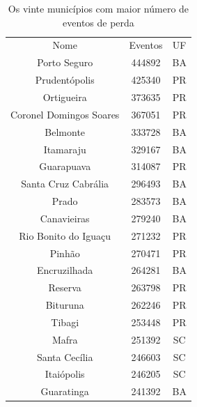 \begin{table}[h!]
    \centering
    \begin{tabular}{|c | c | c|}
    \hline
                    Nome & Eventos & UF \\
            Porto Seguro & 444892 & BA \\
           Prudentópolis & 425340 & PR \\
              Ortigueira & 373635 & PR \\
 Coronel Domingos Soares & 367051 & PR \\
                Belmonte & 333728 & BA \\
               Itamaraju & 329167 & BA \\
              Guarapuava & 314087 & PR \\
     Santa Cruz Cabrália & 296493 & BA \\
                   Prado & 283573 & BA \\
             Canavieiras & 279240 & BA \\
    Rio Bonito do Iguaçu & 271232 & PR \\
                  Pinhão & 270471 & PR \\
            Encruzilhada & 264281 & BA \\
                 Reserva & 263798 & PR \\
                Bituruna & 262246 & PR \\
                  Tibagi & 253448 & PR \\
                   Mafra & 251392 & SC \\
           Santa Cecília & 246603 & SC \\
              Itaiópolis & 246205 & SC \\
              Guaratinga & 241392 & BA \\
    \hline
    \end{tabular}
    \caption{Os vinte municípios com maior número de eventos de perda}
    \label{tab:mun_loss}
\end{table}

